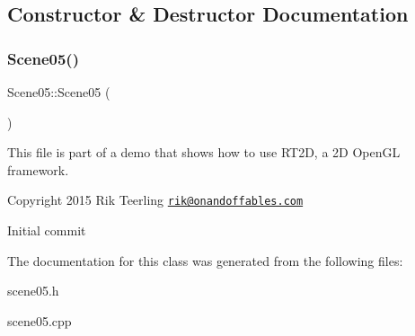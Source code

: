 \subsection{Constructor \& Destructor Documentation}
\mbox{\label{class_scene05_af2500fef131d671d494dd87453b6f9a6}} 
\subsubsection{\texorpdfstring{Scene05()}{Scene05()}}
{\footnotesize\ttfamily Scene05\+::\+Scene05 (\begin{DoxyParamCaption}{ }\end{DoxyParamCaption})}

This file is part of a demo that shows how to use R\+T2D, a 2D Open\+GL framework.


\begin{DoxyItemize}
\item Copyright 2015 Rik Teerling \href{mailto:rik@onandoffables.com}{\tt rik@onandoffables.\+com}
\begin{DoxyItemize}
\item Initial commit 
\end{DoxyItemize}
\end{DoxyItemize}

The documentation for this class was generated from the following files\+:\begin{DoxyCompactItemize}
\item 
scene05.\+h\item 
scene05.\+cpp\end{DoxyCompactItemize}
